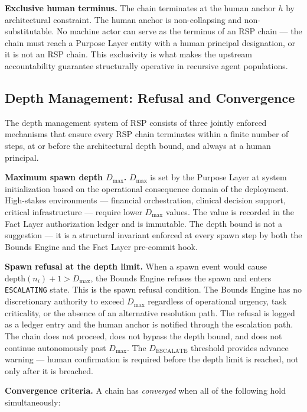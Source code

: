 \medskip
\noindent\textbf{Exclusive human terminus.} The chain terminates at the human anchor $h$ by architectural constraint. The human anchor is non-collapsing and non-substitutable. No machine actor can serve as the terminus of an RSP chain — the chain must reach a Purpose Layer entity with a human principal designation, or it is not an RSP chain. This exclusivity is what makes the \bxthree{} upstream accountability guarantee structurally operative in recursive agent populations.

\subsection{Depth Management: Refusal and Convergence}
\label{sec:rs-depth-mgmt}

The depth management system of RSP consists of three jointly enforced mechanisms that ensure every RSP chain terminates within a finite number of steps, at or before the architectural depth bound, and always at a human principal.

\medskip
\noindent\textbf{Maximum spawn depth $D_{\max}$.} $D_{\max}$ is set by the Purpose Layer at system initialization based on the operational consequence domain of the deployment. High-stakes environments — financial orchestration, clinical decision support, critical infrastructure — require lower $D_{\max}$ values. The value is recorded in the Fact Layer authorization ledger and is immutable. The depth bound is not a suggestion — it is a structural invariant enforced at every spawn step by both the Bounds Engine and the Fact Layer pre-commit hook.

\medskip
\noindent\textbf{Spawn refusal at the depth limit.} When a spawn event would cause $\text{depth}(n_i) + 1 > D_{\max}$, the Bounds Engine refuses the spawn and enters \texttt{ESCALATING} state. This is the spawn refusal condition. The Bounds Engine has no discretionary authority to exceed $D_{\max}$ regardless of operational urgency, task criticality, or the absence of an alternative resolution path. The refusal is logged as a ledger entry and the human anchor is notified through the escalation path. The chain does not proceed, does not bypass the depth bound, and does not continue autonomously past $D_{\max}$. The $D_{\text{ESCALATE}}$ threshold provides advance warning — human confirmation is required before the depth limit is reached, not only after it is breached.

\medskip
\noindent\textbf{Convergence criteria.} A chain has \emph{converged} when all of the following hold simultaneously:

